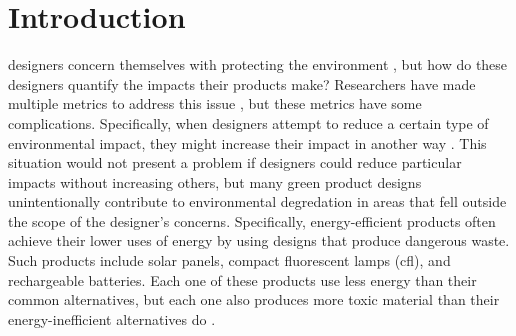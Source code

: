 \documentclass[final,journal,10pt,letterpaper,oneside,twocolumn,compsoc]%
{IEEEtran}
\begin{document}
\maketitle
\IEEEdisplaynontitleabstractindextext




%
\IEEEpeerreviewmaketitle



\section{Introduction}
% 
% 
% 
% 
 designers concern themselves with protecting the
environment \cite{desktop2} \cite{client}, but how do these designers quantify
the
impacts their products make? Researchers have made multiple metrics to address
this issue \cite{14040} \cite{14044} \cite{gabi}, but these metrics have some
complications. Specifically, when designers attempt to reduce a certain type of
environmental impact, they might increase their impact in another way
\cite{solar} \cite{cfl} \cite{battery}. This situation would not present a
problem if designers
could reduce particular impacts without increasing others, but many green
product designs unintentionally contribute to environmental degredation in areas
that fell outside the scope of the designer's concerns. Specifically,
energy-efficient products often achieve their lower uses of energy by using
designs that produce dangerous waste.
Such products include solar panels, compact fluorescent lamps (cfl), and
rechargeable batteries. Each one of these products use less energy than their
common alternatives, but each one also produces more toxic material than their
energy-inefficient alternatives do \cite{solar} \cite{cfl} \cite{battery}.
\end{document}
